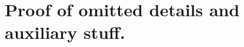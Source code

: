 \documentclass{article}      %
\newcommand{\T}[0]{\text{T}}
\begin{document}
%
%
%
%
%
%
%
%
%
%
%
%
%






\section{ Proof of omitted details and auxiliary stuff. }
\end{document}
